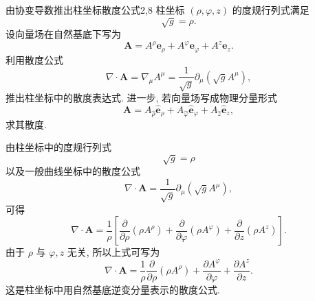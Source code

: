 \begin{example}{由协变导数推出柱坐标散度公式}{2,8}
	柱坐标 $(\rho,\varphi,z)$ 的度规行列式满足
	\[
	\sqrt{g}=\rho.
	\]
	设向量场在自然基底下写为
	\[
	\bm{A}
	=
	A^{\rho}\bm{e}_{\rho}
	+
	A^{\varphi}\bm{e}_{\varphi}
	+
	A^{z}\bm{e}_{z}.
	\]
	利用散度公式
	\[
	\nabla\cdot\bm{A}
	=
	\nabla_{\mu}A^{\mu}
	=
	\frac{1}{\sqrt{g}}\partial_{\mu}(\sqrt{g}A^{\mu}),
	\]
	推出柱坐标中的散度表达式. 进一步, 若向量场写成物理分量形式
	\[
	\bm{A}
	=
	A_{\hat{\rho}}\hat{\bm{e}}_{\rho}
	+
	A_{\hat{\varphi}}\hat{\bm{e}}_{\varphi}
	+
	A_{\hat{z}}\hat{\bm{e}}_{z},
	\]
	求其散度. 
	\begin{solution}
		由柱坐标中的度规行列式
		\[
		\sqrt{g}=\rho
		\]
		以及一般曲线坐标中的散度公式
		\[
		\nabla\cdot\bm{A}
		=
		\frac{1}{\sqrt{g}}\partial_{\mu}(\sqrt{g}A^{\mu}),
		\]
		可得
		\[
		\nabla\cdot\bm{A}
		=
		\frac{1}{\rho}
		\left[
		\frac{\partial}{\partial\rho}(\rho A^{\rho})
		+
		\frac{\partial}{\partial\varphi}(\rho A^{\varphi})
		+
		\frac{\partial}{\partial z}(\rho A^{z})
		\right].
		\]
		由于 $\rho$ 与 $\varphi,z$ 无关, 所以上式可写为
		\[
		\nabla\cdot\bm{A}
		=
		\frac{1}{\rho}
		\frac{\partial}{\partial\rho}(\rho A^{\rho})
		+
		\frac{\partial A^{\varphi}}{\partial\varphi}
		+
		\frac{\partial A^{z}}{\partial z}.
		\]
		这是柱坐标中用自然基底逆变分量表示的散度公式. 
		

\end{solution}
\end{example}
